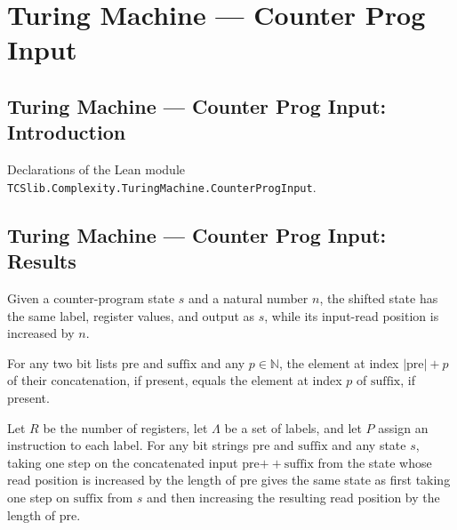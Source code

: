 \section{Turing Machine --- Counter Prog Input}
\subsection*{Turing Machine --- Counter Prog Input: Introduction}

Declarations of the Lean module \texttt{TCSlib.Complexity.TuringMachine.CounterProgInput}.

\subsection*{Turing Machine --- Counter Prog Input: Results}

\begin{definition}
\label{Complexity.CounterProg.shiftInput}
\leanok
{}
Given a counter-program state $s$ and a natural number $n$, the shifted state has the
same label, register values, and output as $s$, while its input-read position is
increased by $n$.
\end{definition}

\begin{theorem}
\leanok
{}
For any two bit lists $\mathrm{pre}$ and $\mathrm{suffix}$ and any $p\in\mathbb N$, the
element at index $|\mathrm{pre}|+p$ of their concatenation, if present, equals the
element at index $p$ of $\mathrm{suffix}$, if present.
\end{theorem}

\begin{theorem}
\label{Complexity.CounterProg.step_shiftInput}
\leanok
{}
Let $R$ be the number of registers, let $\Lambda$ be a set of labels, and let $P$ assign
an instruction to each label. For any bit strings $\mathrm{pre}$ and $\mathrm{suffix}$
and any state $s$, taking one step on the concatenated input $\mathrm{pre} \mathbin{+\!\!+}\mathrm{suffix}$
from the state whose read position is increased by the length of
$\mathrm{pre}$ gives the same state as first taking one step on $\mathrm{suffix}$ from
$s$ and then increasing the resulting read position by the length of $\mathrm{pre}$.
\end{theorem}

